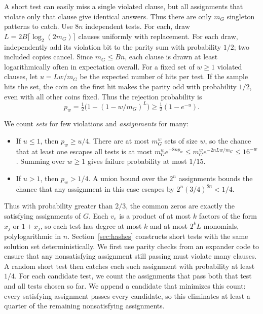 \documentclass[11pt,reqno]{amsart}
\numberwithin{equation}{section}
\theoremstyle{definition}\newtheorem{definition}[theorem]{Definition}
\theoremstyle{remark}\newtheorem{remark}[theorem]{Remark}
\renewcommand{\le}{\leqslant}
\renewcommand{\ge}{\geqslant}
\begin{document}
A short test can easily miss a single violated clause, but all
assignments that violate only that clause give identical answers.
Thus there are only $m_G$ singleton patterns to catch. Use $8n$
independent tests. For each, draw $L=2B\lceil\log_2(2m_G)\rceil$
clauses uniformly with replacement. For each draw, independently add
its violation bit to the parity sum with probability $1/2$; two
included copies cancel. Since $m_G\le Bn$, each clause is drawn
at least logarithmically often in expectation overall. For a fixed
set of $w\ge1$ violated clauses, let $u=Lw/m_G$ be the expected number
of hits per test. If the sample hits the set, the coin on the first
hit makes the parity odd with probability $1/2$, even with all other
coins fixed. Thus the rejection probability is
\[
 p_w=\tfrac12\bigl(1-(1-w/m_G)^L\bigr)\ge\tfrac12(1-e^{-u}).
\]

We count \emph{sets} for few violations and \emph{assignments} for many:
\begin{itemize}
\item If $u\le1$, then $p_w\ge u/4$. There are at most $m_G^w$ sets
of size $w$, so the chance that at least one escapes all tests is
at most $m_G^w e^{-8np_w}\le m_G^w e^{-2nLw/m_G}\le16^{-w}$.
Summing over $w\ge1$ gives failure probability at most $1/15$.
\item If $u>1$, then $p_w>1/4$. A union bound over the $2^n$
assignments bounds the chance that any assignment in this case
escapes by $2^n(3/4)^{8n}<1/4$.
\end{itemize}
Thus with probability greater than $2/3$, the common zeros are
exactly the satisfying assignments of $G$. Each $v_e$ is a product
of at most $k$ factors of the form $x_j$ or $1+x_j$, so each test has degree at
most $k$ and at most $2^kL$ monomials, polylogarithmic in $n$.
Section~\ref{sec:hashes} constructs short tests with the same
solution set deterministically.
We first use parity checks from an expander code to ensure that any
nonsatisfying assignment still passing must violate many clauses.
A random short test then catches each such assignment with probability
at least $1/4$. For each candidate test, we count
the assignments that pass both that test and all tests chosen so far.
We append a candidate that minimizes this count: every satisfying assignment
passes every candidate, so this eliminates at least a quarter of the
remaining nonsatisfying assignments.
\end{document}
